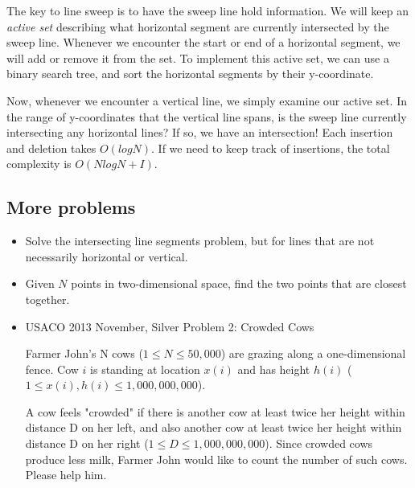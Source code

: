 \documentclass{article}
\begin{document}
The key to line sweep is to have the sweep line hold information. We will keep an \textit{active set} describing what horizontal segment are currently intersected by the sweep line. Whenever we encounter the start or end of a horizontal segment, we will add or remove it from the set. To implement this active set, we can use a binary search tree, and sort the horizontal segments by their y-coordinate.

Now, whenever we encounter a vertical line, we simply examine our active set. In the range of y-coordinates that the vertical line spans, is the sweep line currently intersecting any horizontal lines? If so, we have an intersection! Each insertion and deletion takes $O(log N)$. If we need to keep track of insertions, the total complexity is $O(N log N + I)$.

\subsection{More problems}

\begin{itemize}
    \item Solve the intersecting line segments problem, but for lines that are not necessarily horizontal or vertical.
    \item Given $N$ points in two-dimensional space, find the two points that are closest together.

    \item USACO 2013 November, Silver Problem 2: Crowded Cows
    
    Farmer John's N cows ($1 \leq N \leq 50,000$) are grazing along a one-dimensional fence.  Cow $i$ is standing at location $x(i)$ and has height $h(i)$ ($1 \leq x(i), h(i) \leq 1,000,000,000$).  

    A cow feels "crowded" if there is another cow at least twice her height within distance D on her left, and also another cow at least twice her height within distance D on her right ($1 \leq D \leq 1,000,000,000$).  Since crowded cows produce less milk, Farmer John would like to count the number of such cows.  Please help him.
\end{itemize}
\end{document}
